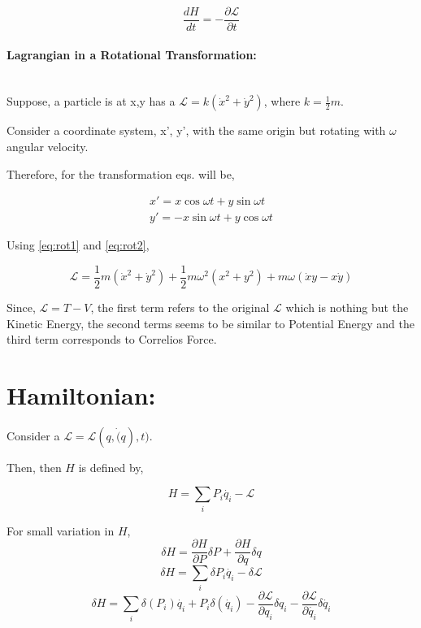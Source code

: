 \documentclass[a4paper]{article}
\newcommand{\Lagr}{\mathcal{L}}
\newcommand{\ddtf}[1]{\frac{d #1}{dt}}
\newcommand{\pdt}[2]{\frac{\partial #1}{\partial #2}}
\newcommand{\half}{\frac{1}{2}}
\begin{document}
				\begin{equation}
					\ddtf{H} = - \pdt{\Lagr}{t}
				\end{equation}


	\paragraph*{Lagrangian in a Rotational Transformation: }\noindent\hfill\\
		 
		Suppose, a particle is at x,y has a $\Lagr = k (\dot{x}^2 + \dot{y}^2)$, where $ k = \half m $.

		Consider a coordinate system, {x', y'}, with the same origin but rotating with $\omega$ angular velocity.

		Therefore, for the transformation eqs. will be,

		\begin{eqnarray}
			x' = x\cos{\omega t} + y\sin{\omega t}\label{eq:rot1} \\
			y' = -x\sin{\omega t} + y\cos{\omega t}\label{eq:rot2}
		\end{eqnarray}
		

		Using \eqref{eq:rot1} and \eqref{eq:rot2},

		\begin{equation}
			\Lagr = \half m (\dot{x}^2 + \dot{y}^2) + \half m \omega^2(x^2 + y^2) + m \omega (\dot{x}y - x\dot{y})
		\end{equation}

		Since, $ \Lagr = T - V $, the first term refers to the original $\Lagr$ which is nothing but the Kinetic Energy, the second terms seems to be similar to Potential Energy and the third term corresponds to Correlios Force.


	\section*{Hamiltonian: }
		\noindent \hfill

		Consider a $\Lagr = \Lagr(q, \dot(q), t)$.

		Then, then $H$ is defined by, 

		\begin{equation}
			H = \sum_i P_i \dot{q_i} - \Lagr
		\end{equation}

		For small variation in $H$,
		\begin{equation}
			\delta H = \pdt{H}{P} \delta P + \pdt{H}{q}\delta q \label{eq_var_H}
		\end{equation}
		$$ \delta H = \sum_i \delta P_i\dot{q_i} - \delta \Lagr $$
		$$ \delta H = \sum_i \delta(P_i) \dot{q_i} + P_i\delta(\dot{q_i}) - \pdt{\Lagr}{q_i}\delta q_i - \pdt{\Lagr}{\dot{q_i}}\delta \dot{q_i} $$
\end{document}
